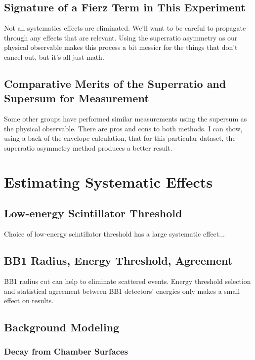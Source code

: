 \section{Signature of a Fierz Term in This Experiment}
	Not all systematics effects are eliminated.  We'll want to be careful to propagate through any effects that are relevant.  Using the superratio asymmetry as our physical observable makes this process a bit messier for the things that don't cancel out, but it's all just math.  
	
\section{Comparative Merits of the Superratio and Supersum for Measurement}
	Some other groups have performed similar measurements using the supersum as the physical observable.  There are pros and cons to both methods.  I can show, using a back-of-the-envelope calculation, that for this particular dataset, the superratio asymmetry method produces a better result.  
	

\chapter{Estimating Systematic Effects}
	\section{Low-energy Scintillator Threshold}
	Choice of low-energy scintillator threshold has a large systematic effect...  
	
	\section{BB1 Radius, Energy Threshold, Agreement}
	BB1 radius cut can help to eliminate scattered events.  Energy threshold selection and statistical agreement between BB1 detectors' energies only makes a small effect on results.  

\section{Background Modeling}
	\subsection{Decay from Chamber Surfaces}

